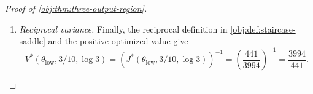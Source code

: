 \begin{proof}[Proof of \cref{obj:thm:three-output-region}]
\begin{enumerate}
The normalization equations at input coordinates \(0,1,3\) now reduce to
\[
\begin{aligned}
3\beta_{S_1}+\beta_{S_6}+\beta_{S_8}&=1,\\
\beta_{S_1}+3\beta_{S_6}+\beta_{S_8}&=1,\\
\beta_{S_1}+\beta_{S_6}+3\beta_{S_8}&=1.
\end{aligned}
\]
Their differences give
\[
2(\beta_{S_1}-\beta_{S_6})=0,
\qquad
2(\beta_{S_6}-\beta_{S_8})=0,
\]
and substitution gives
\[
\beta_{S_1}=\beta_{S_6}=\beta_{S_8}=\frac15.
\]
For \(S\in\mathcal K\), these weights equal \(\alpha_S\); for \(S\notin\mathcal K\), both weights are zero. Therefore \(\beta=\alpha\).

\item \textit{Reciprocal variance.}
Finally, the reciprocal definition in \cref{obj:def:staircase-saddle} and the positive optimized value give
\[
V^*(\theta_{\mathrm{low}},3/10,\log3)
=
\left(J^*(\theta_{\mathrm{low}},3/10,\log3)\right)^{-1}
=
\left(\frac{441}{3994}\right)^{-1}
=
\frac{3994}{441}.
\]
\end{enumerate}
\end{proof}

